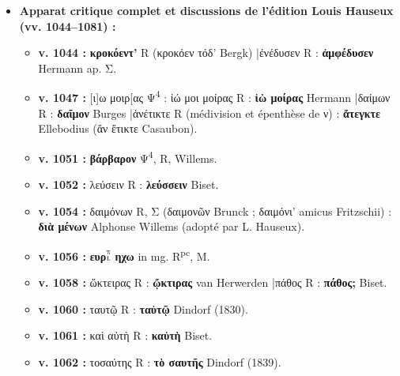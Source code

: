 \documentclass[10pt, a4paper, twoside]{book}
\renewcommand{\_}{\origunderscore\penalty0\relax}
\renewcommand{\texttt}[1]{#1}
\providecommand{\lecon}[1]{\textbf{#1}}
\providecommand{\expo}[1]{\textsuperscript{#1}}
\providecommand{\Rpc}{R\expo{pc}}
\providecommand{\Mon}{M}
\providecommand{\PsiQuatre}{\textgreek{Ψ}\textsuperscript{4}}
\providecommand{\espApp}{\hspace{0.5em}|\hspace{0.5em}}
\providecommand{\auDessus}[2]{\ensuremath{\overset{\text{#2}}{\text{#1}}}}
\begin{document}
\begin{itemize}
\begin{itemize}
    \begin{itemize}
      \item \textbf{v. 1071 :} μέρος ἐξέλαχον; R $\to$ \lecon{μόρος ἔξελ' ἄχος.} \lecon{Bibi} ;
      \item \textbf{v. 1072 :} θανάτου τλήμων R (maintenu avec la conjecture \lecon{θαλάττης τέμνον} \lecon{Bibi} en apparat) ;
      \item \textbf{vv. 1073–1074 :} R écrit στωμυλλωμένη avec deux λ au v. 1073, mais στωμυλωμένη avec \textbf{un seul λ} au v. 1074 ; \textbf{Bibi explique cette dissymétrie graphique de R en restituant au v. 1074 le composé \lecon{στωμυλιομενής}} ;
      \item \textbf{v. 1078 :} (Εὐρ.) παῦσαι R $\to$ \lecon{(Εὐρ.) 'παΰσαι} \lecon{Bibi} ;
      \item \textbf{v. 1079 :} βάλλ' ἐς κόρακας R $\to$ \lecon{βάλλε σύ κόρακας} \lecon{Bibi}.
    \end{itemize}
  \end{itemize}
  \item \textbf{Apparat critique complet et discussions de l'édition Louis Hauseux (\texttt{vv. 1044–1081}) :}
  \begin{itemize}
    \item \textbf{v. 1044 :} \lecon{κροκόεντ'} R (κροκόεν τόδ' Bergk) \espApp ἐνέδυσεν R : \lecon{ἀμφέδυσεν} Hermann ap. Σ.
    \item \textbf{v. 1047 :} [ι]ω μοιρ[ας \PsiQuatre{} : ἰώ μοι μοίρας R : \lecon{ἰὼ μοίρας} Hermann \espApp δαίμων R : \lecon{δαῖμον} Burges \espApp ἀνέτικτε R (médivision et épenthèse de ν) : \lecon{ἄτεγκτε} Ellebodius (ἅν ἔτικτε Casaubon).
    \item \textbf{v. 1051 :} \lecon{βάρβαρον} \PsiQuatre{}, R, Willems.
    \item \textbf{v. 1052 :} λεύσειν R : \lecon{λεύσσειν} Biset.
    \item \textbf{v. 1054 :} δαιμόνων R, Σ (δαιμονῶν Brunck ; δαιμόνι' amicus Fritzschii) : \lecon{διὰ μένων} Alphonse Willems (adopté par L. Hauseux).
    \item \textbf{v. 1056 :} \lecon{ευρ\auDessus{ι}{π} ηχω} in mg. \Rpc{}, \Mon{}.
    \item \textbf{v. 1058 :} ὤκτειρας R : \lecon{ᾤκτιρας} van Herwerden \espApp πάθος R : \lecon{πάθος;} Biset.
    \item \textbf{v. 1060 :} ταυτῷ R : \lecon{ταὐτῷ} Dindorf (1830).
    \item \textbf{v. 1061 :} καὶ αὐτὴ R : \lecon{καὐτὴ} Biset.
    \item \textbf{v. 1062 :} τοσαύτης R : \lecon{τὸ σαυτῆς} Dindorf (1839).

\end{itemize}
\end{itemize}
\end{document}

